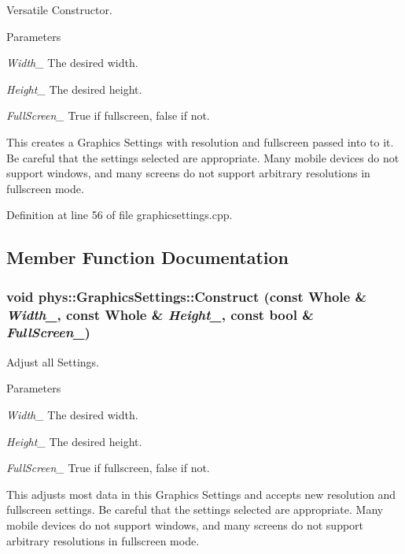 Versatile Constructor. 


\begin{DoxyParams}{Parameters}
\item[{\em Width\_\-}]The desired width. \item[{\em Height\_\-}]The desired height. \item[{\em FullScreen\_\-}]True if fullscreen, false if not.\end{DoxyParams}
This creates a Graphics Settings with resolution and fullscreen passed into to it. Be careful that the settings selected are appropriate. Many mobile devices do not support windows, and many screens do not support arbitrary resolutions in fullscreen mode. 

Definition at line 56 of file graphicsettings.cpp.



\subsection{Member Function Documentation}
\hypertarget{classphys_1_1GraphicsSettings_a63d41a500ee1ddf0ea9ffba5e353bae0}{
\subsubsection[{Construct}]{\setlength{\rightskip}{0pt plus 5cm}void phys::GraphicsSettings::Construct (const {\bf Whole} \& {\em Width\_\-}, \/  const {\bf Whole} \& {\em Height\_\-}, \/  const bool \& {\em FullScreen\_\-})}}
\label{dc/df1/classphys_1_1GraphicsSettings_a63d41a500ee1ddf0ea9ffba5e353bae0}


Adjust all Settings. 


\begin{DoxyParams}{Parameters}
\item[{\em Width\_\-}]The desired width. \item[{\em Height\_\-}]The desired height. \item[{\em FullScreen\_\-}]True if fullscreen, false if not.\end{DoxyParams}
This adjusts most data in this Graphics Settings and accepts new resolution and fullscreen settings. Be careful that the settings selected are appropriate. Many mobile devices do not support windows, and many screens do not support arbitrary resolutions in fullscreen mode. 

